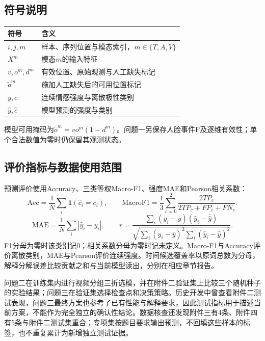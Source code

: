 \subsection{符号说明}
\begin{longtable}{ll}
\toprule 符号 & 含义\\\midrule
$i,j,m$ & 样本、序列位置与模态索引，$m\in\{T,A,V\}$\\
$X^m$ & 模态$m$的输入特征\\
$v,o^m,d^m$ & 有效位置、原始观测与人工缺失标记\\
$\widetilde o^m$ & 施加人工缺失后的可用位置标记\\
$y,c$ & 连续情感强度与离散极性类别\\
$\widehat y,\widehat c$ & 模型预测的强度与类别\\\bottomrule
\end{longtable}
模型可用掩码为$\widetilde o^m=v o^m(1-d^m)$。问题一另保存人脸事件F及逐维有效性；单个合法数值为零时仍保留其观测状态。

\subsection{评价指标与数据使用范围}
预测评价使用Accuracy、三类等权Macro-F1、强度MAE和Pearson相关系数：
\begin{equation}
\mathrm{Acc}=\frac1N\sum_i\mathbf1(\widehat c_i=c_i),\qquad
\mathrm{MacroF1}=\frac13\sum_{c=0}^2\frac{2TP_c}{2TP_c+FP_c+FN_c}.
\end{equation}
\begin{equation}
\mathrm{MAE}=\frac1N\sum_i|\widehat y_i-y_i|,\qquad
r=\frac{\sum_i(y_i-\bar y)(\widehat y_i-\overline{\widehat y})}{\sqrt{\sum_i(y_i-\bar y)^2\sum_i(\widehat y_i-\overline{\widehat y})^2}}.
\end{equation}
F1分母为零时该类别记0；相关系数分母为零时记未定义。Macro-F1与Accuracy评价离散类别，MAE与Pearson评价连续强度。时间候选覆盖率以原词总数为分母，解释分解误差比较贡献之和与当前模型读出，分别在相应章节报告。


问题二在训练集内进行视频分组三折选模，并在附件二验证集上比较三个随机种子的实验结果；问题三在验证集选择检查点和决策策略。历史开发中曾查看附件二测试表现，问题三最终方案也参考了已有性能与解释要求，因此测试指标用于描述当前方案，不能作为完全独立的确认性结论。数据核查还发现附件三有4条、附件四有5条与附件二测试集重合；专项集按题目要求输出预测，不回填这些样本的标签，也不重复累计为新增独立测试证据。
